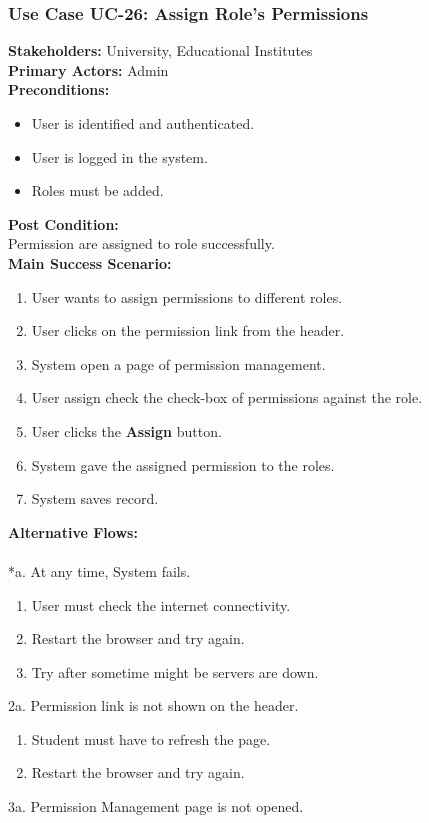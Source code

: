 \documentclass[12pt]{article}
\begin{document}
\subsubsection{Use Case UC-26: Assign Role's Permissions}
\textbf{Stakeholders: } University, Educational Institutes \\
\textbf{Primary Actors: }Admin \\
\textbf{Preconditions:}
\begin{itemize}
\item User is identified and authenticated.
\item User is logged in the system.
\item Roles must be added.
\end{itemize}
\textbf{Post Condition: }\\
Permission are assigned to role successfully.\\
\textbf{Main Success Scenario:}
\begin{enumerate}
\item User wants to assign permissions to different roles.
\item User clicks on the permission link from the header.
\item System open a page of permission management.
\item User assign check the check-box of permissions against the role.
\item User clicks the \textbf{Assign} button.
\item System gave the assigned permission to the roles.
\item System saves record.
\end{enumerate}
\textbf{Alternative Flows:}\\
\\
*a. At any time, System fails.
\begin{enumerate}
\item User must check the internet connectivity.
\item Restart the browser and try again.
\item Try after sometime might be servers are down.
\end{enumerate}
2a. Permission link is not shown on the header.
\begin{enumerate}
\item Student must have to refresh the page.
\item Restart the browser and try again.
\end{enumerate} 
3a. Permission Management page is not opened.
\end{document}
